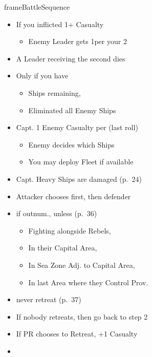 \documentclass[10pt]{article}
\newlength{\fhBattleSequence} \setlength\fhBattleSequence{50\baselineskip}
\begin{document}
\begin{dynamiccontents*}{frameBattleSequence}
\begin{eubox}{\fhBattleSequence}
\begin{multicols}{2}
\begin{itemize}
		\end{itemize}
		\begin{itemize}
			\item If you inflicted 1+ Casualty
			\begin{itemize}
				\item Enemy Leader gets 1\illhealth per your 2\tercios
			\end{itemize}
			\item A Leader receiving the second \illhealth dies
		\end{itemize}
		\begin{itemize}
			\item Only if you have
			\begin{itemize}
				\item Ships remaining, 
				\item Eliminated all Enemy Ships
			\end{itemize}
			\item Capt. 1 Enemy Casualty per \tercios (last roll)
			\begin{itemize}
				\item Enemy decides which Ships 
				\item You may deploy Fleet if available
			\end{itemize}
			\item Capt. Heavy Ships are damaged (p.~24)
		\end{itemize}
		\begin{itemize}
			\item Attacker chooses first, then defender
			\item {} if outnum., unless (p.~36)
			\begin{itemize}
				\item Fighting alongside Rebels, 
				\item In their Capital Area, 
				\item In Sea Zone Adj. to Capital Area, 
				\item In last Area where they Control Prov.
			\end{itemize}
			\item {} never retreat (p.~37)
			\item If nobody retreats, then go back to step 2
			\item If PR chooses to Retreat, +1 Casualty
			\item {}

\end{itemize}
\end{multicols}
\end{eubox}
\end{dynamiccontents*}
\end{document}
